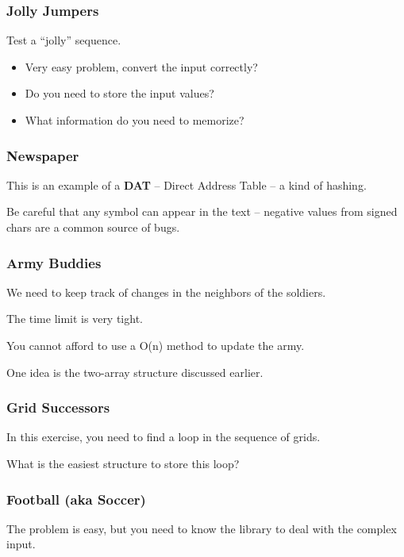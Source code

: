 \documentclass{beamer}
\begin{document}
\begin{frame}
  \frametitle{Jolly Jumpers}
  Test a ``jolly'' sequence.
  \begin{itemize}
  \item Very easy problem, convert the input correctly?
  \item Do you need to store the input values?
  \item What information do you need to memorize?
  \end{itemize}
\end{frame}

\begin{frame}
  \frametitle{Newspaper}

  This is an example of a {\bf DAT} -- Direct Address Table -- a kind
  of hashing.

  \bigskip

  Be careful that any symbol can appear in the text -- negative values
  from signed chars are a common source of bugs.
  
\end{frame}

\begin{frame}
  \frametitle{Army Buddies}

  We need to keep track of changes in the neighbors of the
  soldiers.

  \bigskip
  
  The time limit is very tight.

  \bigskip

  You cannot afford to use a O(n) method to update the army.

  \bigskip

  One idea is the two-array structure discussed earlier.
\end{frame}

\begin{frame}
  \frametitle{Grid Successors}

  In this exercise, you need to find a loop in the sequence of grids.

  \bigskip

  What is the easiest structure to store this loop?
  
\end{frame}

\begin{frame}
  \frametitle{Football (aka Soccer)}

  The problem is easy, but you need to know the library to deal with
  the complex input.
\end{frame}
\end{document}
